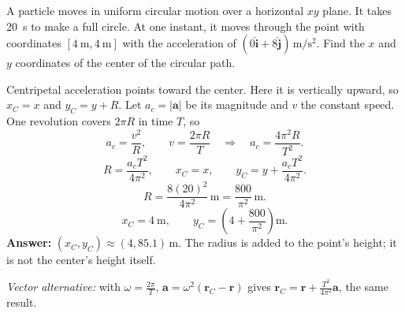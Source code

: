 \quiznextproblem
\begin{problem}[25 pts]
A particle moves in uniform circular motion over a horizontal $xy$ plane.
It takes \qty{20}{\second} to make a full circle. At one instant, it moves
through the point with coordinates $[\qty{4}{\metre},\qty{4}{\metre}]$
with the acceleration of
$(0\hat{\mathbf i}+8\hat{\mathbf j})\,\unit{\metre\per\second\squared}$.
Find the $x$ and $y$ coordinates of the center of the circular path.
\end{problem}
\begin{solution}
Centripetal acceleration points toward the center.
Here it is vertically upward, so $x_C=x$ and $y_C=y+R$.
Let $a_c=|\mathbf a|$ be its magnitude and $v$ the constant speed.
One revolution covers $2\pi R$ in time $T$, so
\[
a_c=\frac{v^2}{R},\qquad v=\frac{2\pi R}{T}
\quad\Longrightarrow\quad a_c=\frac{4\pi^2R}{T^2}.
\]
\[
R=\frac{a_cT^2}{4\pi^2},\qquad
x_C=x,\qquad y_C=y+\frac{a_cT^2}{4\pi^2}.
\]
\[
R=\frac{8(20)^2}{4\pi^2}\,\unit{\metre}
=\frac{800}{\pi^2}\,\unit{\metre}.
\]
\[
x_C=\qty{4}{\metre},\qquad
y_C=\left(4+\frac{800}{\pi^2}\right)\unit{\metre}.
\]
\textbf{Answer:} $(x_C,y_C)\approx(4,85.1)\,\unit{\metre}$.
The radius is added to the point's height; it is not the center's height itself.

\textit{Vector alternative:} with $\omega=\frac{2\pi}{T}$,
$\mathbf a=\omega^2(\mathbf r_C-\mathbf r)$ gives
$\mathbf r_C=\mathbf r+\frac{T^2}{4\pi^2}\mathbf a$, the same result.
\end{solution}
